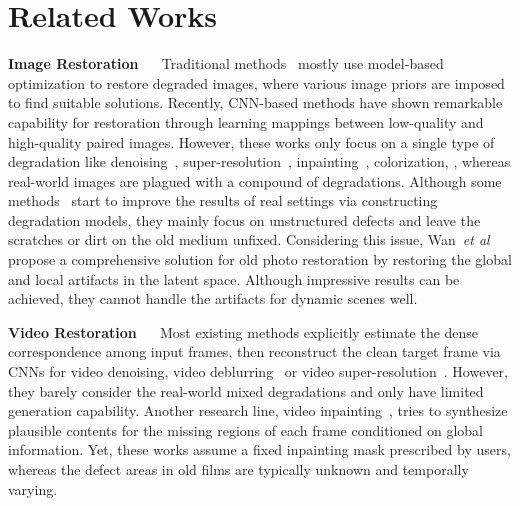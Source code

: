 \documentclass[10pt,twocolumn,letterpaper]{article}
\def\etal{\emph{et al}\onedot}
\begin{document}
\section{Related Works}
	
	\noindent\textbf{Image Restoration} ~~ Traditional methods~\cite{buades2005non,elad2006image,weiss2007makes,babacan2008total} mostly use model-based optimization to restore degraded images, where various image priors are imposed to find suitable solutions. Recently, CNN-based methods have shown remarkable capability for restoration through learning mappings between low-quality and high-quality paired images. However, these works only focus on a single type of degradation like denoising~\cite{zhang2017beyond,zhang2018ffdnet,mao2016image}, super-resolution~\cite{kim2016accurate,ledig2017photo,zhang2018residual,wang2018esrgan}, inpainting~\cite{yu2019free,liu2021pd,Wan_2021_ICCV}, colorization\cite{he2018deep}, \etc, whereas real-world images are plagued with a compound of degradations. Although some methods~\cite{zhang2021designing,wang2021real,liang2021swinir} start to improve the results of real settings via constructing degradation models, they mainly focus on unstructured defects and leave the scratches or dirt on the old medium unfixed. Considering this issue, Wan~\etal~\cite{wan2020bringing, wan2020old} propose a comprehensive solution for old photo restoration by restoring the global and local artifacts in the latent space. Although impressive results can be achieved, they cannot handle the artifacts for dynamic scenes well.
	
	\noindent\textbf{Video Restoration} ~~ 
	Most existing methods explicitly estimate the dense correspondence among input
	frames, then reconstruct the clean target frame via CNNs for video denoising\cite{claus2019videnn,tassano2020fastdvdnet}, video deblurring~\cite{su2017deep,zhou2019spatio} or video super-resolution~\cite{wang2019edvr,haris2019recurrent,chan2021basicvsr}. However, they barely consider the real-world mixed degradations and only have limited generation capability. Another research line, video inpainting~\cite{xu2019deep,kim2019deep,gao2020flow}, tries to synthesize plausible contents for the missing regions of each frame conditioned on global information. Yet, these works assume a fixed inpainting mask prescribed by users, whereas the defect areas in old films are typically unknown and temporally varying. 
	
\end{document}

